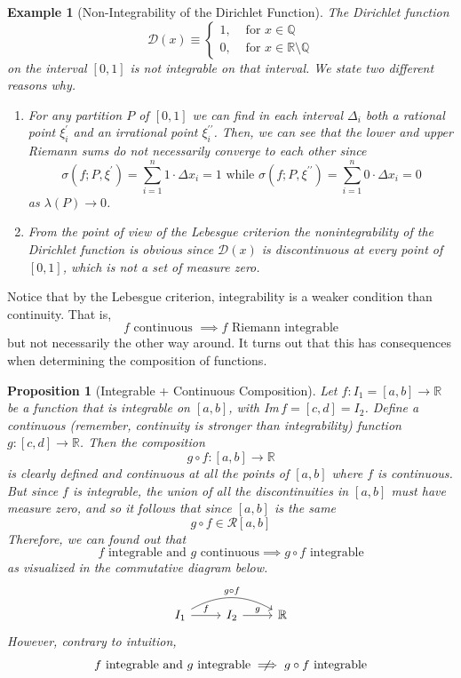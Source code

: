 \documentclass{article}
\newtheorem{proposition}[theorem]{Proposition}
\newtheorem{example}{Example}[section]
\theoremstyle{remark}
\theoremstyle{definition}
\begin{document}
\begin{example}[Non-Integrability of the Dirichlet Function]
The Dirichlet function
\[\mathcal{D}(x) \equiv \begin{cases}
1, & \text{ for } x \in \mathbb{Q} \\
0, & \text{ for } x \in \mathbb{R} \setminus \mathbb{Q}
\end{cases}\]
on the interval $[0,1]$ is not integrable on that interval. We state two different reasons why. 
\begin{enumerate}
    \item For any partition $P$ of $[0,1]$ we can find in each interval $\Delta_i$ both a rational point $\xi^\prime_i$ and an irrational point $\xi_i^{\prime\prime}$. Then, we can see that the lower and upper Riemann sums do not necessarily converge to each other since
    \[\sigma(f; P, \xi^\prime) = \sum_{i=1}^n 1 \cdot \Delta x_i = 1 \text{ while } \sigma(f;P, \xi^{\prime\prime}) = \sum_{i=1}^n 0 \cdot \Delta x_i = 0\]
    as $\lambda(P) \rightarrow 0$. 
    \item From the point of view of the Lebesgue criterion the nonintegrability of the Dirichlet function is obvious since $\mathcal{D}(x)$ is discontinuous at every point of $[0, 1]$, which is not a set of measure zero. 
\end{enumerate}
\end{example}

Notice that by the Lebesgue criterion, integrability is a weaker condition than continuity. That is, 
\[f \text{ continuous } \implies f \text{ Riemann integrable}\]
but not necessarily the other way around. It turns out that this has consequences when determining the composition of functions. 

\begin{proposition}[Integrable + Continuous Composition]
Let $f: I_1 = [a, b] \longrightarrow\mathbb{R}$ be a function that is integrable on $[a, b]$, with Im$\,f = [c, d] = I_2$. Define a continuous (remember, continuity is stronger than integrability) function $g: [c, d] \longrightarrow \mathbb{R}$. Then the composition
\[g \circ f: [a, b] \longrightarrow \mathbb{R}\]
is clearly defined and continuous at all the points of $[a, b]$ where $f$ is continuous. But since $f$ is integrable, the union of all the discontinuities in $[a, b]$ must have measure zero, and so it follows that since $[a, b]$ is the same  
\[g \circ f \in \mathcal{R}[a, b]\]
Therefore, we can found out that 
\[f \text{ integrable and } g \text{ continuous} \implies g \circ f \text{ integrable}\]
as visualized in the commutative diagram below. 
\[
  \begin{tikzcd}
    I_1 \arrow[r, "f"] \arrow[rr, bend left, "g \circ f"] & I_2 \arrow[r, "g"] & \mathbb{R}
  \end{tikzcd}
\]
However, contrary to intuition, 
\[f \text{ integrable and } g \text{ integrable} \centernot\implies g \circ f \text{ integrable}\]
\end{proposition}
\end{document}
